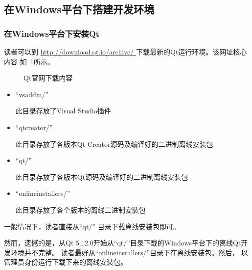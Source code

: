 ﻿




%

\FloatBarrier
\subsection{
在Windows平台下搭建开发环境
}\label{s000110}


\FloatBarrier
\subsubsection{
在Windows平台下安装Qt
}\label{ss000110}


读者可以到 \url{http://download.qt.io/archive/
}
下载最新的Qt运行环境。该网址核心内容
如\figurename\ \ref{p000000a}所示。

\begin{figure}[htb] %
\marginnote{\setlength\fboxsep{2pt}\fbox{\footnotesize{\kaishu\figurename\,}\footnotesize{\ref{p000000a}}}}\centering %
\setlength\fboxsep{0pt} %
\caption{Qt官网下载内容} %
\label{p000000a} %
\end{figure}


\begin{itemize}
\item “vsaddin/” 

此目录存放了Visual Studio插件
\item “qtcreator/” 

此目录存放了各版本Qt Creator源码及编译好的二进制离线安装包
\item “qt/” 

此目录存放了各版本Qt源码及编译好的二进制离线安装包
\item “online\underline{\hspace{0.5em}}installers/”

此目录存放了各个版本的离线二进制安装包
\end{itemize}

一般情况下，读者直接从“qt/” 目录下载离线安装包即可。

然而，遗憾的是，从Qt 5.12.0开始从“qt/”目录下载的Windows平台下的离线Qt开发环境并不完整。
读者最好从“online\underline{\hspace{0.5em}}installers/”目录下在离线安装包。然后，
以管理员身份运行下载下来的离线安装包。

